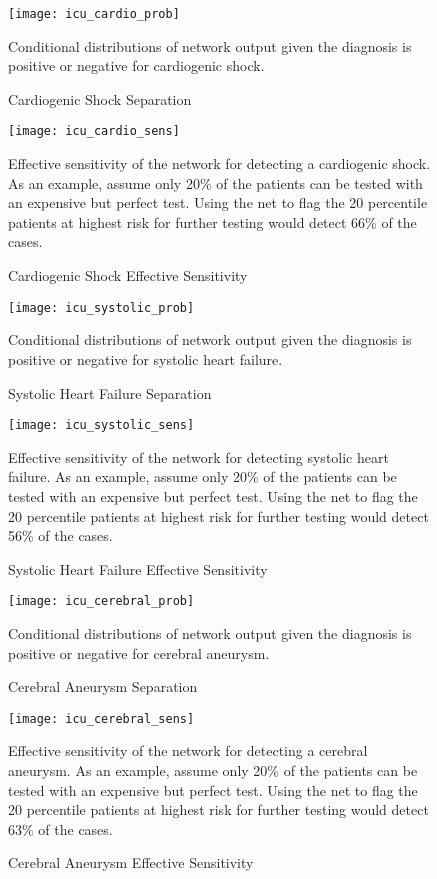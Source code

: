 \begin{figure}
\texttt{[image: icu\_cardio\_prob]}
\caption{Cardiogenic Shock Separation}
\vspace{12px}
Conditional distributions of network output given the diagnosis is positive or negative for cardiogenic shock.
\label{fig:icu_cardio_prob}
\end{figure}

\begin{figure}
\texttt{[image: icu\_cardio\_sens]}
\caption{Cardiogenic Shock Effective Sensitivity}
\vspace{12px}
Effective sensitivity of the network for detecting a cardiogenic shock.  As an example, assume only 20\% of the patients can be tested with an expensive but perfect test. Using the net to flag the 20 percentile patients at highest risk for further testing would detect 66\% of the cases.
\label{fig:icu_cardio_sens}
\end{figure}

\begin{figure}
\texttt{[image: icu\_systolic\_prob]}
\caption{Systolic Heart Failure Separation}
\vspace{12px}
Conditional distributions of network output given the diagnosis is positive or negative for systolic heart failure.
\label{fig:icu_systolic_prob}
\end{figure}

\begin{figure}
\texttt{[image: icu\_systolic\_sens]}
\caption{Systolic Heart Failure Effective Sensitivity}
\vspace{12px}
Effective sensitivity of the network for detecting systolic heart failure.  As an example, assume only 20\% of the patients can be tested with an expensive but perfect test. Using the net to flag the 20 percentile patients at highest risk for further testing would detect 56\% of the cases.
\label{fig:icu_systolic_sens}
\end{figure}

\begin{figure}
\texttt{[image: icu\_cerebral\_prob]}
\caption{Cerebral Aneurysm Separation}
\vspace{12px}
Conditional distributions of network output given the diagnosis is positive or negative for cerebral aneurysm.
\label{fig:icu_cerebral_prob}
\end{figure}

\begin{figure}
\texttt{[image: icu\_cerebral\_sens]}
\caption{Cerebral Aneurysm Effective Sensitivity}
\vspace{12px}
Effective sensitivity of the network for detecting a cerebral aneurysm.  As an example, assume only 20\% of the patients can be tested with an expensive but perfect test. Using the net to flag the 20 percentile patients at highest risk for further testing would detect 63\% of the cases.
\label{fig:icu_cerebral_sens}
\end{figure}

